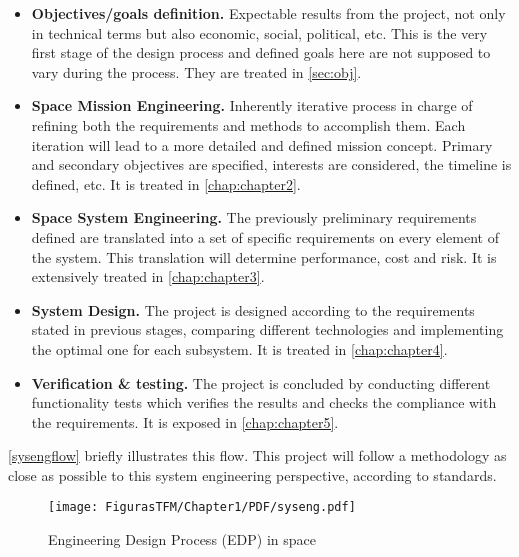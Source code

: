 \begin{itemize} [noitemsep,topsep=0pt]

	\item \textbf{Objectives/goals definition.} Expectable results from the project, not only in technical terms but also economic, social, political, etc. This is the very first stage of the design process and defined goals here are not supposed to vary during the process. They are treated in \autoref{sec:obj}. \\

	\item \textbf{Space Mission Engineering.} Inherently iterative process in charge of refining both the requirements and methods to accomplish them. Each iteration will lead to a more detailed and defined mission concept. Primary and secondary objectives are specified,  interests are considered, the timeline is defined, etc. It is treated in \autoref{chap:chapter2}. \\

	\item \textbf{Space System Engineering.} The previously preliminary requirements defined are translated into a set of specific requirements on every element of the system. This translation will determine performance, cost and risk. It is extensively treated in \autoref{chap:chapter3}. \\

	\item \textbf{System Design.} The project is designed according to the requirements stated in previous stages, comparing different technologies and implementing the optimal one for each subsystem. It is treated in \autoref{chap:chapter4}. \\

	\item \textbf{Verification \& testing.} The project is concluded by conducting different functionality tests which verifies the results and checks the compliance with the requirements. It is exposed in \autoref{chap:chapter5}. \\

\end{itemize}

\autoref{sysengflow} briefly illustrates this flow. This project will follow a methodology as close as possible to this system engineering perspective, according to \cite{ecss} standards.

	\begin{figure}[H]
			\centering
			\texttt{[image: FigurasTFM/Chapter1/PDF/syseng.pdf]}
 		\caption{Engineering Design Process (\acrshort{EDP}) in space} \label{sysengflow}
				\vspace{-2cm}
		\end{figure}


